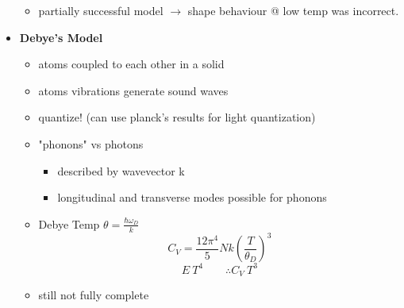 \begin{itemize}
\begin{itemize}
        \item partially successful model $\rightarrow$ shape behaviour @ low temp was incorrect.
    \end{itemize}
    \item \textbf{Debye's Model}
    \begin{itemize}
        \item atoms coupled to each other in a solid
        \item atoms vibrations generate sound waves
        \item quantize! (can use planck's results for light quantization)
        \item "phonons" vs photons
        \begin{itemize}
            \item described by wavevector k
            \item longitudinal and transverse modes possible for phonons
        \end{itemize}
        \item Debye Temp $\theta = \frac{\hbar \omega_D}{k}$
        \[C_V = \frac{12\pi^4}{5}Nk\left(\frac{T}{\theta_D}\right)^3\]
        \[E~T^4 \qquad \therefore C_V~T^3\]
        \item still not fully complete
    \end{itemize}
\end{itemize}
